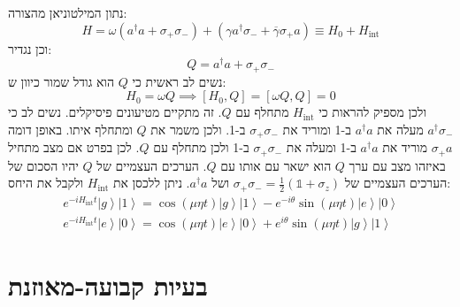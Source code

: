 \documentclass{tstextbook}
\begin{document}
\begin{example}
נתון המילטוניאן מהצורה:
$$H=\omega\left(a^{\dagger}a+\sigma_{+}\sigma_{-}\right)+\left(\gamma a^{\dagger}\sigma_{-}+\overline{{{\gamma}}}\sigma_{+}a\right)\equiv H_{0}+H_{\mathrm{int}}$$
וכן נגדיר:
$$Q=a^{\dagger}a+\sigma_{+}\sigma_{-}$$
נשים לב ראשית כי \(Q\) הוא גודל שמור כיוון ש:
$$H_{0}=\omega Q\implies [H_{0},Q]=\left[ \omega Q,Q \right]=0$$
ולכן מספיק להראות כי \(H_{\text{int}}\) מתחלף עם \(Q\). זה מתקיים מטיעונים פיסיקלים. נשים לב כי \(a^{\dagger}\sigma_{-}\) מעלה את \(a^{\dagger}a\) ב-1 ומוריד את \(\sigma_{+}\sigma_{-}\) ב-1. ולכן משמר את \(Q\) ומתחלף איתו. באופן דומה \(\sigma_{+}a\) מוריד את \(a^{\dagger}a\) ב-1 ומעלה את \(\sigma_{+}\sigma_{-}\) ב-1 ולכן מתחלף עם \(Q\). לכן בפרט אם מצב מתחיל באיזהו מצב עם ערך \(Q\) הוא ישאר עם אותו עם \(Q\).
הערכים העצמיים של \(Q\) יהיו הסכום של הערכים העצמיים של \(\sigma_{+}\sigma_{-}=\frac{1}{2}\left( \mathbb{1}+\sigma_{z} \right)\) ושל \(a^{\dagger}a\).
ניתן ללכסן את \(H_{\text{int}}\) ולקבל את היחס:
\begin{gather*}e^{-i H_{\mathrm{int}}t}\left|g\right\rangle\left|1\right\rangle=\cos\left(\mu\eta t\right)\left|g\right\rangle\left|1\right\rangle-e^{-i\theta}\sin\left(\mu\eta t\right)\left|e\right\rangle\left|0\right\rangle\\ e^{-i H_{\mathrm{int}}t}\left|e\right\rangle\left|0\right\rangle=\cos\left(\mu\eta t\right)\left|e\right\rangle\left|0\right\rangle+e^{i\theta}\sin\left(\mu\eta t\right)\left|g\right\rangle\left|1\right\rangle 
\end{gather*}

\end{example}

\section{בעיות קבועה-מאוזנת}
\end{document}
